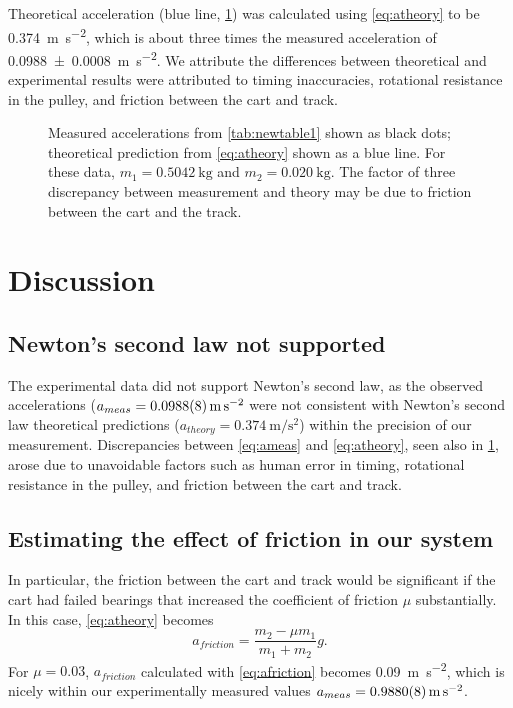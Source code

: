 \documentclass[reprint,amsmath,amssymb,aps,twoside]{revtex4-2}
\begin{document}
Theoretical acceleration (blue line, \cref{fig:results}) was calculated using \cref{eq:atheory} to be \qty{0.374}{\meter\per\second\squared}, which is about three times the measured acceleration of \qty{0.0988\pm0.0008}{\meter\per\second\squared}. We attribute the differences between theoretical and experimental results were attributed to timing inaccuracies, rotational resistance in the pulley, and friction between the cart and track.
\begin{figure}
\begin{center}

\end{center}
\caption{\label{fig:results} Measured accelerations from \cref{tab:newtable1} shown as black dots; theoretical prediction from \cref{eq:atheory} shown as a blue line. For these data, $m_1=\qty{0.5042}{\kilo\gram}$ and $m_2=\qty{0.020}{\kilo\gram}$. The factor of three discrepancy between measurement and theory may be due to friction between the cart and the track.} 
\end{figure}





\section{Discussion}
\subsection{Newton's second law not supported}
The experimental data did not support Newton’s second law, as the observed accelerations ($a_{meas}=\qty{0.0988\pm0.0008}{\meter\per\second\squared}$ were not consistent with Newton's second law theoretical predictions ($a_{theory}=\qty{0.374}{\meter\per\second\squared}$) within the precision of our measurement. Discrepancies between \cref{eq:ameas} and \cref{eq:atheory}, seen also in \cref{fig:results}, arose due to unavoidable factors such as human error in timing, rotational resistance in the pulley, and friction between the cart and track.

\subsection{Estimating the effect of friction in our system}
In particular, the friction between the cart and track would be significant if the cart had failed bearings that increased the coefficient of friction $\mu$ substantially. In this case, \cref{eq:atheory} becomes
\begin{equation}
a_{friction} = \dfrac{m_2 - \mu m_1}{m_1 + m_2} g.
\label{eq:afriction}
\end{equation}
For $\mu=0.03$, $a_{friction}$ calculated with \cref{eq:afriction} becomes \qty{0.09}{\meter\per\second\squared}, which is nicely within our experimentally measured values $a_{meas}=\qty{0.988\pm0.0008}{\meter\per\second\squared}$. 
\end{document}
